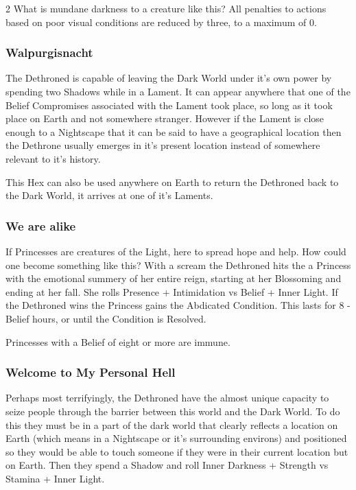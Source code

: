 \begin{multicols}{2}
What is mundane darkness to a creature like this? All penalties to actions based on poor visual conditions are reduced by three, to a maximum of 0.

\subsubsection*{Walpurgisnacht}

The Dethroned is capable of leaving the Dark World under it's own power by spending two Shadows while in a Lament. It can appear anywhere that one of the Belief Compromises associated with the Lament took place, so long as it took place on Earth and not somewhere stranger. However if the Lament is close enough to a Nightscape that it can be said to have a geographical location then the Dethrone usually emerges in it's present location instead of somewhere relevant to it's history. 

This Hex can also be used anywhere on Earth to return the Dethroned back to the Dark World, it arrives at one of it's Laments. 

\subsubsection*{We are alike}

If Princesses are creatures of the Light, here to spread hope and help. How could one become something like this? With a scream the Dethroned hits the a Princess with the emotional summery of her entire reign, starting at her Blossoming and ending at her fall. She rolls Presence + Intimidation vs Belief + Inner Light. If the Dethroned wins the Princess gains the Abdicated Condition. This lasts for 8 - Belief hours, or until the Condition is Resolved. 

Princesses with a Belief of eight or more are immune. 

\subsubsection*{Welcome to My Personal Hell}

Perhaps most terrifyingly, the Dethroned have the almost unique capacity to seize people through the barrier between this world and the Dark World. To do this they must be in a part of the dark world that clearly reflects a location on Earth (which means in a Nightscape or it's surrounding environs) and positioned so they would be able to touch someone if they were in their current location but on Earth. Then they spend a Shadow and roll Inner Darkness + Strength vs Stamina + Inner Light. 


\end{multicols}
